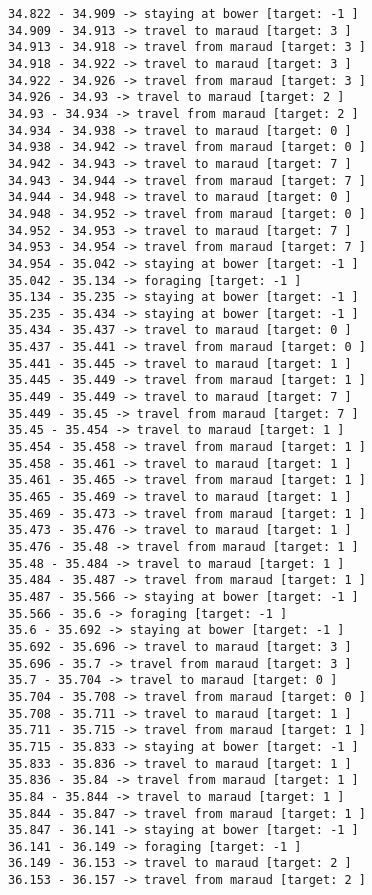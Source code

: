 \documentclass[11pt]{article}
\begin{document}
\begin{Verbatim}[commandchars=\\\{\}]
34.822 - 34.909 -> staying at bower [target: -1 ]
34.909 - 34.913 -> travel to maraud [target: 3 ]
34.913 - 34.918 -> travel from maraud [target: 3 ]
34.918 - 34.922 -> travel to maraud [target: 3 ]
34.922 - 34.926 -> travel from maraud [target: 3 ]
34.926 - 34.93 -> travel to maraud [target: 2 ]
34.93 - 34.934 -> travel from maraud [target: 2 ]
34.934 - 34.938 -> travel to maraud [target: 0 ]
34.938 - 34.942 -> travel from maraud [target: 0 ]
34.942 - 34.943 -> travel to maraud [target: 7 ]
34.943 - 34.944 -> travel from maraud [target: 7 ]
34.944 - 34.948 -> travel to maraud [target: 0 ]
34.948 - 34.952 -> travel from maraud [target: 0 ]
34.952 - 34.953 -> travel to maraud [target: 7 ]
34.953 - 34.954 -> travel from maraud [target: 7 ]
34.954 - 35.042 -> staying at bower [target: -1 ]
35.042 - 35.134 -> foraging [target: -1 ]
35.134 - 35.235 -> staying at bower [target: -1 ]
35.235 - 35.434 -> staying at bower [target: -1 ]
35.434 - 35.437 -> travel to maraud [target: 0 ]
35.437 - 35.441 -> travel from maraud [target: 0 ]
35.441 - 35.445 -> travel to maraud [target: 1 ]
35.445 - 35.449 -> travel from maraud [target: 1 ]
35.449 - 35.449 -> travel to maraud [target: 7 ]
35.449 - 35.45 -> travel from maraud [target: 7 ]
35.45 - 35.454 -> travel to maraud [target: 1 ]
35.454 - 35.458 -> travel from maraud [target: 1 ]
35.458 - 35.461 -> travel to maraud [target: 1 ]
35.461 - 35.465 -> travel from maraud [target: 1 ]
35.465 - 35.469 -> travel to maraud [target: 1 ]
35.469 - 35.473 -> travel from maraud [target: 1 ]
35.473 - 35.476 -> travel to maraud [target: 1 ]
35.476 - 35.48 -> travel from maraud [target: 1 ]
35.48 - 35.484 -> travel to maraud [target: 1 ]
35.484 - 35.487 -> travel from maraud [target: 1 ]
35.487 - 35.566 -> staying at bower [target: -1 ]
35.566 - 35.6 -> foraging [target: -1 ]
35.6 - 35.692 -> staying at bower [target: -1 ]
35.692 - 35.696 -> travel to maraud [target: 3 ]
35.696 - 35.7 -> travel from maraud [target: 3 ]
35.7 - 35.704 -> travel to maraud [target: 0 ]
35.704 - 35.708 -> travel from maraud [target: 0 ]
35.708 - 35.711 -> travel to maraud [target: 1 ]
35.711 - 35.715 -> travel from maraud [target: 1 ]
35.715 - 35.833 -> staying at bower [target: -1 ]
35.833 - 35.836 -> travel to maraud [target: 1 ]
35.836 - 35.84 -> travel from maraud [target: 1 ]
35.84 - 35.844 -> travel to maraud [target: 1 ]
35.844 - 35.847 -> travel from maraud [target: 1 ]
35.847 - 36.141 -> staying at bower [target: -1 ]
36.141 - 36.149 -> foraging [target: -1 ]
36.149 - 36.153 -> travel to maraud [target: 2 ]
36.153 - 36.157 -> travel from maraud [target: 2 ]

\end{Verbatim}
\end{document}
